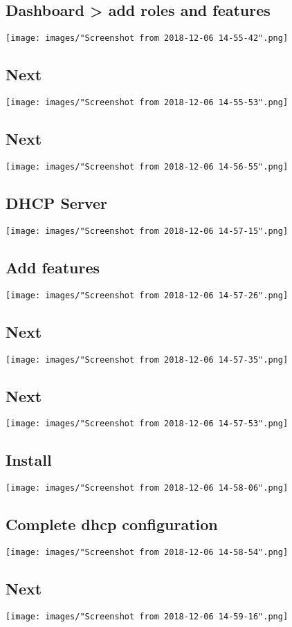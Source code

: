 \documentclass[slovak]{article}
\begin{document}
  \subsection{Dashboard > add roles and features}
  \texttt{[image: images/"Screenshot from 2018-12-06 14-55-42".png]}
  \subsection{Next}
  \texttt{[image: images/"Screenshot from 2018-12-06 14-55-53".png]}
  \subsection{Next}
  \texttt{[image: images/"Screenshot from 2018-12-06 14-56-55".png]}
  \subsection{DHCP Server}
  \texttt{[image: images/"Screenshot from 2018-12-06 14-57-15".png]}
  \subsection{Add features}
  \texttt{[image: images/"Screenshot from 2018-12-06 14-57-26".png]}
  \subsection{Next}
  \texttt{[image: images/"Screenshot from 2018-12-06 14-57-35".png]}
  \subsection{Next}
  \texttt{[image: images/"Screenshot from 2018-12-06 14-57-53".png]}
  \subsection{Install}
  \texttt{[image: images/"Screenshot from 2018-12-06 14-58-06".png]}
  \subsection{Complete dhcp configuration}
  \texttt{[image: images/"Screenshot from 2018-12-06 14-58-54".png]}
  \subsection{Next}
  \texttt{[image: images/"Screenshot from 2018-12-06 14-59-16".png]}
\end{document}
